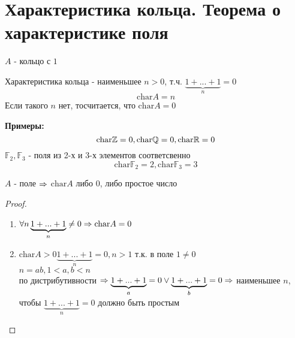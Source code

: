 \section{Характеристика кольца. Теорема о характеристике поля}
$A$ - кольцо с $1$\\

\begin{Def}
	Характеристика кольца - наименьшее $n > 0$, т.ч. $\underbrace{1+...+1}_{n} = 0$
		$$ \mathrm{char} A = n $$
	Если такого $n$ нет, тосчитается, что $\mathrm{char} A = 0$\\
\end{Def}

\textbf{Примеры:}
	$$ \mathrm{char} \mathbb{Z} = 0, \mathrm{char} \mathbb{Q} = 0, \mathrm{char} \mathbb{R} = 0 $$
	$ \mathbb{F}_2, \mathbb{F}_3$ - поля из 2-х и 3-х элементов соответсвенно\\
	$$ \mathrm{char} \mathbb{F}_2 = 2, \mathrm{char} \mathbb{F}_3 = 3 $$

\begin{Rem} 
	$A$ - поле $\Rightarrow$ $\mathrm{char} A$ либо $0$, либо простое число
\end{Rem}

\begin{proof}
	\begin{enumerate}
	\item $\forall n \underbrace{1 + ... + 1}_{n} \neq 0 \Rightarrow \mathrm{char} A = 0$
	\item $\mathrm{char} A > 0 \underbrace{1 + ... + 1}_{n} = 0, n > 1$ т.к. в поле $1 \neq 0$\\
	$n = ab, 1 < a, b < n$ \\
	по дистрибутивности $\Rightarrow \underbrace{1+...+1}_a = 0 \vee \underbrace{1+...+1}_b = 0 \Rightarrow$
	наименьшее $n$, чтобы $\underbrace{1 + ... + 1}_{n} = 0$ должно быть простым
	\end{enumerate}
\end{proof}
